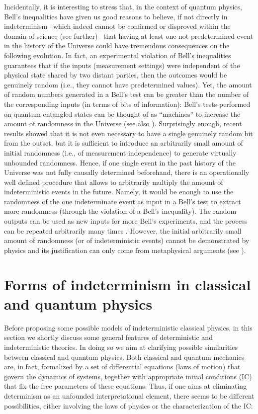 \documentclass[12pt]{article}
\begin{document}
Incidentally, it is interesting to stress that, in the context of quantum physics, Bell's inequalities \cite{bell} have given us good reasons to believe, if not directly in indeterminism --which indeed cannot be confirmed or disproved within the domain of science (see further)-- that having at least one not predetermined event in the history of the Universe could have tremendous consequences on the following evolution. In fact, an experimental violation of Bell’s inequalities guarantees that if the inputs (measurement settings) were independent of the physical state shared by two distant parties, then the outcomes would be genuinely random (i.e., they cannot have predetermined values). Yet, the amount of random numbers generated in a Bell's test can be greater than the number of the corresponding inputs (in terms of bits of information): Bell's tests performed on quantum entangled states can be thought of as “machines” to increase the amount of randomness in the Universe (see also \cite{gisin2010}). Surprisingly enough, recent results \cite{renner, putz} showed that it is not even necessary to have a single genuinely random bit from the outset, but it is sufficient to introduce an arbitrarily small amount of initial randomness (i.e., of measurement independence) to generate virtually unbounded randomness. Hence, if one single event in the past history of the Universe was not fully causally determined beforehand, there is an operationally well defined procedure that allows to arbitrarily multiply the amount of indeterministic events in the future. Namely, it would be enough to use the randomness of the one indeterminate event as input in a Bell's test to extract more randomness (through the violation of a Bell's inequality). The random outputs can be used as new inputs for more Bell's experiments, and the process can be repeated arbitrarily many times \cite{amplification}. However, the initial arbitrarily small amount of randomness (or of indeterministic events) cannot be demonstrated by physics and its justification can only come from metaphysical arguments (see \cite{suppes}).



\section{Forms of indeterminism in classical and quantum physics}
Before proposing some possible models of indeterministic classical physics, in this section we shortly discuss some general features of deterministic and indeterministic theories. In doing so we aim at clarifying possible similarities between classical and quantum physics. Both classical and quantum mechanics are, in fact, formalized by a set of differential equations (laws of motion) that govern the dynamics of systems, together with appropriate initial conditions (IC) that fix the free parameters of these equations. Thus, if one aims at eliminating determinism as an unfounded interpretational element, there seems to be different possibilities, either involving the laws of physics or the characterization of the IC:
\end{document}
